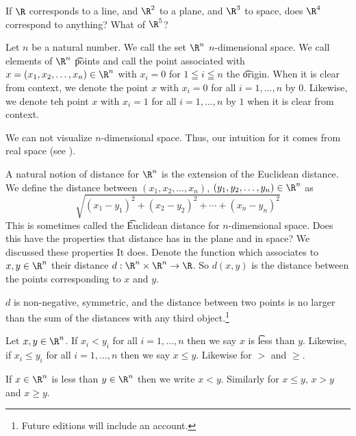 

If $\R$ corresponds to a line, and $\R^2$ to a plane, and $\R^3$ to space, does $\R^4$ correspond to anything? What of $\R^5$?


Let $n$ be a natural number.
We call the set $\R^n$ \t{$n$-dimensional space}.
We call elements of $\R^n$ \t{points} and call the point associated with $x = (x_1, x_2, \dots, x_n) \in \R^n$ with $x_i = 0$ for $1 \leqq i \leqq n$ the \t{origin}.
When it is clear from context, we denote the point $x$ with $x_i = 0$ for all $i = 1, \dots, n$ by $0$.
Likewise, we denote teh point $x$ with $x_i = 1$ for all $i = 1, \dots, n$ by $1$ when it is clear from context.


We can not visualize $n$-dimensional space.
Thus, our intuition for it comes from real space (see ).


A natural notion of distance for $\R^n$ is the extension of the Euclidean distance. We define the distance between $(x_1, x_2, \dots, x_n)$, $(y_1, y_2, \dots, y_n) \in \R^n$ as
\[
  \sqrt{(x_1 - y_1)^2 + (x_2 - y_2)^2 + \cdots + (x_n - y_n)^2}
\]
This is sometimes called the \t{Euclidean distance for $n$-dimensional space}.
Does this have the properties that distance has in the plane and in space?
We discussed these properties
It does.
Denote the function which associates to $x, y \in \R^n$ their distance $d: \R^n \times \R^n \to \R$.
So $d(x, y)$ is the distance between the points corresponding to $x$ and $y$.
\begin{proposition}
  $d$ is non-negative, symmetric, and the distance between two points is no larger than the sum of the distances with any third object.\footnote{Future editions will include an account.}
\end{proposition}


Let $x, y \in \R^n$.
If $x_i < y_i$ for all $i = 1, \dots, n$ then we say $x$ is \t{less than} $y$.
Likewise, if $x_i \leq y_i$ for all $i = 1, \dots, n$ then we say $x \leq y$.
Likewise for $>$ and $\geq$.


If $x \in \R^n$ is less than $y \in \R^n$  then we write $x < y$.
Similarly for $x \leq y$, $x > y$ and $x \geq y$.

